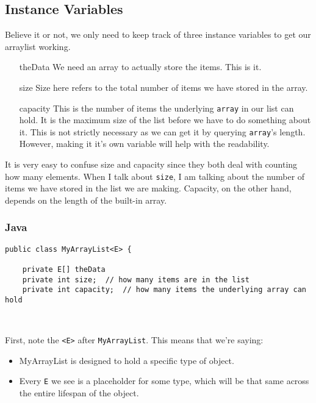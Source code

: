 \subsection{Instance Variables}

Believe it or not, we only need to keep track of three instance variables to get our arraylist working.

\begin{enumerate}
	\item[theData]  We need an array to actually store the items.  This is it.
	\item[size] Size here refers to the total number of items we have stored in the array.
	\item[capacity]  This is the number of items  the underlying \texttt{array} in our list can hold. It is the maximum size of the list before we have to do something about it. This is not strictly necessary as we can get it by querying \texttt{array}'s length. However, making it it's own variable will help with the readability.
\end{enumerate}

It is very easy to confuse size and capacity since they both deal with counting how many elements.  When I talk about \texttt{size}, I am talking about the number of items we have stored in the list we are making.  Capacity, on the other hand, depends on the length of the built-in array. 

\subsubsection{Java}


\begin{verbatim}
public class MyArrayList<E> {
	
	private E[] theData
	private int size;  // how many items are in the list
	private int capacity;  // how many items the underlying array can hold
	
	
\end{verbatim}

First, note the \texttt{<E>} after \texttt{MyArrayList}.  This means that we're saying:
\begin{itemize}
	\item MyArrayList is designed to hold a specific type of object.
	\item Every \texttt{E} we see is a placeholder for some type, which will be that same across the entire lifespan of the object.
\end{itemize}


